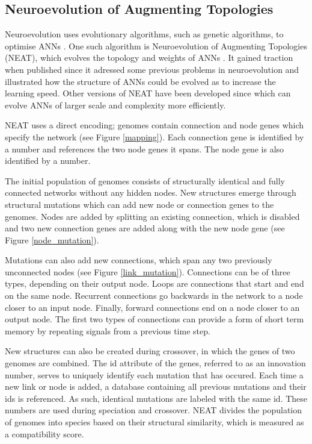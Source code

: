 \newpage

\subsection{Neuroevolution of Augmenting Topologies}
Neuroevolution uses evolutionary algorithms, such as genetic algorithms, to optimise ANNs \cite{neuroevolution_review}.
One such algorithm is Neuroevolution of Augmenting Topologies (NEAT), which evolves the topology and weights of ANNs \cite{neat_main, neat_short, neat_phd}.
It gained traction when published since it adressed some previous problems in neuroevolution and illustrated how the structure of ANNs could be
evolved as to increase the learning speed. Other versions of NEAT have been developed since which can evolve ANNs of larger scale and complexity more efficiently.

NEAT uses a direct encoding; genomes contain connection and node genes which specify the network (see Figure \ref{mapping}). Each connection gene is identified
by a number and references the two node genes it spans. The node gene is also identified by a number.



The initial population of genomes consists of structurally identical and fully connected networks without any hidden nodes.
New structures emerge through structural mutations which can add new node or connection genes to the genomes. Nodes are added by splitting an existing
connection, which is disabled and two new connection genes are added along with the new node gene (see Figure \ref{node_mutation}).



Mutations can also add new connections, which span any two previously unconnected nodes (see Figure \ref{link_mutation}).
Connections can be of three types, depending on their output node. Loops are connections that start and end on the same node. Recurrent connections go backwards in the network to a node closer to an
input node. Finally, forward connections end on a node closer to an output node. The first two types of connections can provide a form of short term memory by repeating
signals from a previous time step.



New structures can also be created during crossover, in which the genes of two genomes are combined.
The id attribute of the genes, referred to as an innovation number, serves to uniquely identify each mutation that has occured.
Each time a new link or node is added, a database containing all previous mutations and their ids is referenced.
As such, identical mutations are labeled with the same id.
These numbers are used during speciation and crossover. NEAT divides the population of genomes into species based on their structural
similarity, which is measured as a compatibility score.



